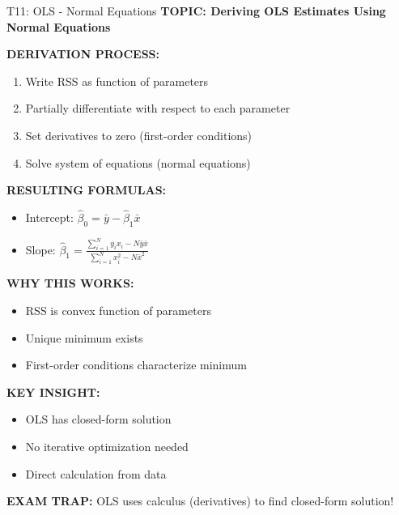\documentclass[8pt]{beamer}
\begin{document}
	\begin{frame}{T11: OLS - Normal Equations}
		\fontsize{6.5}{7.5}\selectfont
		\textbf{TOPIC: Deriving OLS Estimates Using Normal Equations}
		
		\vspace{0.1cm}
		\textbf{DERIVATION PROCESS:}
		\begin{enumerate}
			\item Write RSS as function of parameters
			\item Partially differentiate with respect to each parameter
			\item Set derivatives to zero (first-order conditions)
			\item Solve system of equations (normal equations)
		\end{enumerate}
		
		\vspace{0.1cm}
		\textbf{RESULTING FORMULAS:}
		\begin{itemize}
			\item Intercept: $\hat{\beta}_0 = \bar{y} - \hat{\beta}_1 \bar{x}$
			\item Slope: $\hat{\beta}_1 = \frac{\sum_{i=1}^N y_i x_i - N\bar{y}\bar{x}}{\sum_{i=1}^N x_i^2 - N\bar{x}^2}$
		\end{itemize}
		
		\vspace{0.1cm}
		\textbf{WHY THIS WORKS:}
		\begin{itemize}
			\item RSS is convex function of parameters
			\item Unique minimum exists
			\item First-order conditions characterize minimum
		\end{itemize}
		
		\vspace{0.1cm}
		\textbf{KEY INSIGHT:}
		\begin{itemize}
			\item OLS has closed-form solution
			\item No iterative optimization needed
			\item Direct calculation from data
		\end{itemize}
		
		\textcolor{myred}{\textbf{EXAM TRAP:}} OLS uses \textcolor{myblue}{calculus} (derivatives) to find closed-form solution!
	\end{frame}
	
\end{document}
